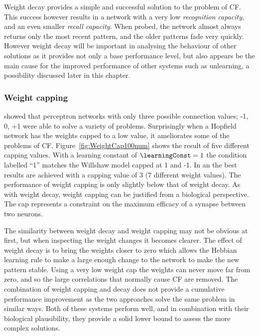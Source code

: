 Weight decay provides a simple and successful solution to the problem of CF.  This success however results in a network with a very low \emph{recognition capacity}, and an even smaller \emph{recall capacity}.  When probed, the network almost always returns only the most recent pattern, and the older patterns fade very quickly.  However weight decay will be important in analysing the behaviour of other solutions as it provides not only a base performance level, but also appears be the main cause for the improved performance of other systems such as unlearning, a possibility discussed later in this chapter.

\subsubsection{Weight capping}

\citet{Willshaw1969} showed that perceptron networks with only three possible connection values; -1, 0, +1 were able to solve a variety of problems. Surprisingly when a Hopfield network has the weights capped to a low value, it ameliorates some of the problems of CF. Figure~\ref{fig:WeightCap100num} shows the result of five different capping values.  With a learning constant of $\learningConst = 1$ the condition labelled ``1'' matches the Willshaw model capped at 1 and -1.  In an  the best results are achieved with a capping value of $3$ (7 different weight values).  The performance of weight capping is only slightly below that of weight decay.  As with weight decay, weight capping can be justified from a biological perspective.  The cap represents a constraint on the maximum efficacy of a synapse between two neurons.

The similarity between weight decay and weight capping may not be obvious at first, but when inspecting the weight changes it becomes clearer.  The effect of weight decay is to bring the weights closer to zero which allows the Hebbian learning rule to make a large enough change to the network to make the new pattern stable.  Using a very low weight cap the weights can never move far from zero, and so the large correlations that normally cause CF are removed.  The combination of weight capping and decay does not provide a cumulative performance improvement as the two approaches solve the same problem in similar ways. Both of these systems perform well, and in combination with their biological plausibility, they provide a solid lower bound to assess the more complex solutions.  

